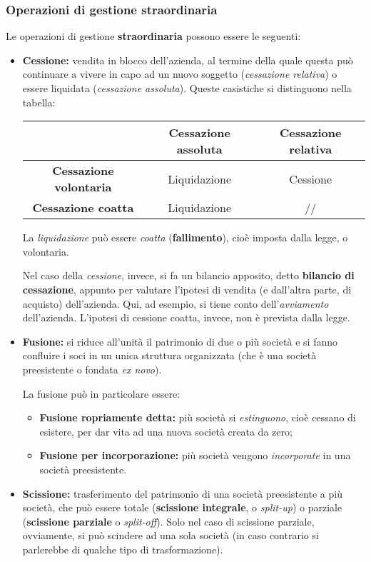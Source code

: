 \documentclass[a4paper,11pt]{article}
\begin{document}
\subsubsection{Operazioni di gestione straordinaria}
Le operazioni di gestione \textbf{straordinaria} possono essere le seguenti:
\begin{itemize}
	\item \textbf{Cessione:} vendita in blocco dell'azienda, al termine della quale questa può continuare a vivere in capo ad un nuovo soggetto (\textit{cessazione relativa}) o essere liquidata (\textit{cessazione assoluta}).
		Queste casistiche si distinguono nella tabella:
		\begin{table}[h!]
			\center {}
			\begin{tabular} { c | c | c }
				& \bfseries Cessazione assoluta & \bfseries Cessazione relativa \\
				\hline
				\bfseries Cessazione volontaria & Liquidazione & Cessione \\ 
				\bfseries Cessazione coatta & Liquidazione & // \\
			\end{tabular}
		\end{table}

		La \textit{liquidazione} può essere \textit{coatta} (\textbf{fallimento}), cioè imposta dalla legge, o volontaria.

		Nel caso della \textit{cessione}, invece, si fa un bilancio apposito, detto \textbf{bilancio di cessazione}, appunto per valutare l'ipotesi di vendita (e dall'altra parte, di acquisto) dell'azienda.
		Qui, ad esempio, si tiene conto dell'\textit{avviamento} dell'azienda.
		L'ipotesi di cessione coatta, invece, non è prevista dalla legge.

	\item \textbf{Fusione:} si riduce all'unità il patrimonio di due o più società e si fanno confluire i soci in un unica struttura organizzata (che è una società preesistente o fondata \textit{ex novo}).

		La fusione può in particolare essere:
		\begin{itemize}
			\item \textbf{Fusione ropriamente detta:} più società si \textit{estinguono}, cioè cessano di esistere, per dar vita ad una nuova società creata da zero;
			\item \textbf{Fusione per incorporazione:} più società vengono \textit{incorporate} in una società preesistente.
		\end{itemize}
	\item \textbf{Scissione:} trasferimento del patrimonio di una società preesistente a più società, che può essere totale (\textbf{scissione integrale}, o \textit{split-up}) o parziale (\textbf{scissione parziale} o \textit{split-off}).
		Solo nel caso di scissione parziale, ovviamente, si può scindere ad una sola società (in caso contrario si parlerebbe di qualche tipo di trasformazione).


\end{itemize}
\end{document}
